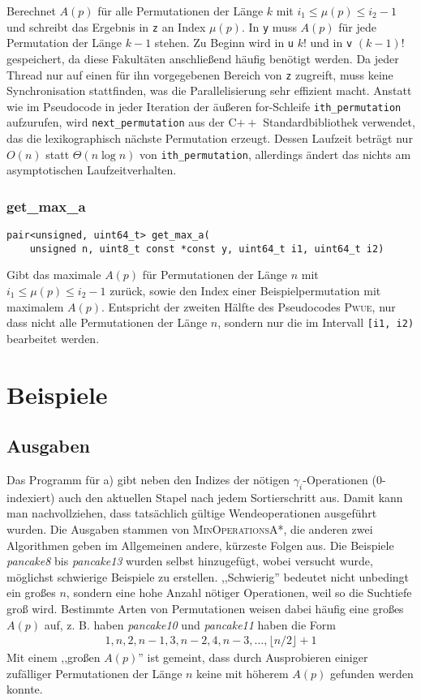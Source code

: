 \documentclass[a4paper, 10pt, ngerman]{article}
\begin{document}
\noindent Berechnet $A(p)$ für alle Permutationen der Länge $k$ mit $i_1 \le \mu(p) \le i_2 - 1$ und schreibt das Ergebnis in \verb|z| an Index $\mu(p)$. In \verb|y| muss $A(p)$ für jede Permutation der Länge $k-1$ stehen. Zu Beginn wird in \verb|u| $k!$ und in \verb|v| $(k - 1)!$ gespeichert, da diese Fakultäten anschließend häufig benötigt werden. Da jeder Thread nur auf einen für ihn vorgegebenen Bereich von \verb|z| zugreift, muss keine Synchronisation stattfinden, was die Parallelisierung sehr effizient macht. Anstatt wie im Pseudocode in jeder Iteration der äußeren for-Schleife \verb|ith_permutation| aufzurufen, wird \verb|next_permutation| aus der C$++$ Standardbibliothek verwendet, das die lexikographisch nächste Permutation erzeugt. Dessen Laufzeit beträgt nur $O(n)$ statt $\Theta(n \log n)$ von \verb|ith_permutation|, allerdings ändert das nichts am asymptotischen Laufzeitverhalten.

\subsubsection{get\_max\_a}
\verb|pair<unsigned, uint64_t> get_max_a(| \\
\verb|    unsigned n, uint8_t const *const y, uint64_t i1, uint64_t i2)|
\medskip

\noindent Gibt das maximale $A(p)$ für Permutationen der Länge $n$ mit $i_1 \le \mu(p) \le i_2 - 1$ zurück, sowie den Index einer Beispielpermutation mit maximalem $A(p)$. Entspricht der zweiten Hälfte des Pseudocodes \textsc{Pwue}, nur dass nicht alle Permutationen der Länge $n$, sondern nur die im Intervall \verb|[i1, i2)| bearbeitet werden.

\section{Beispiele}

\subsection{Ausgaben}

Das Programm für a) gibt neben den Indizes der nötigen $\gamma_i$-Operationen (0-indexiert) auch den aktuellen Stapel nach jedem Sortierschritt aus. Damit kann man nachvollziehen, dass tatsächlich gültige Wendeoperationen ausgeführt wurden. Die Ausgaben stammen von \textsc{MinOperationsA*}, die anderen zwei Algorithmen geben im Allgemeinen andere, kürzeste Folgen aus. Die Beispiele \emph{pancake8} bis \emph{pancake13} wurden selbst hinzugefügt, wobei versucht wurde, möglichst schwierige Beispiele zu erstellen. ,,Schwierig'' bedeutet nicht unbedingt ein großes $n$, sondern eine hohe Anzahl nötiger Operationen, weil so die Suchtiefe groß wird. Bestimmte Arten von Permutationen weisen dabei häufig eine großes $A(p)$ auf, z. B. haben \emph{pancake10} und \emph{pancake11} haben die Form
\begin{align*}
    1, n, 2, n - 1, 3, n - 2, 4, n - 3, \dots, \lfloor n/2 \rfloor + 1
\end{align*}
Mit einem ,,großen $A(p)$'' ist gemeint, dass durch Ausprobieren einiger zufälliger Permutationen der Länge $n$ keine mit höherem $A(p)$ gefunden werden konnte.
\end{document}
